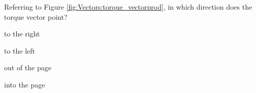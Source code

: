 
\begin{checkpoint}
\begin{MCquestion}{Referring to Figure \ref{fig:Vectors:torque_vectorprod}, in which direction does the torque vector point?}
\item to the right
\item to the left
\item out of the page 
\item into the page \correct
\end{MCquestion}
\end{checkpoint}